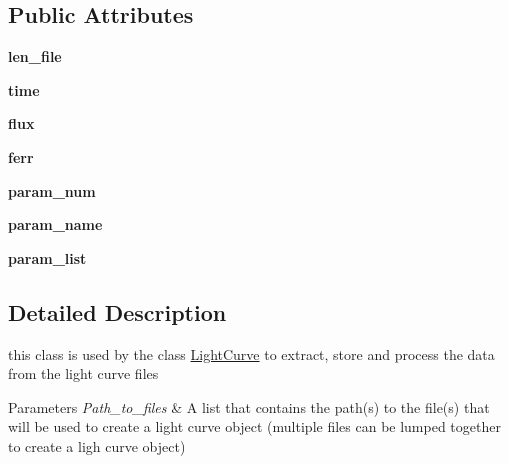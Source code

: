 \subsection*{Public Attributes}
\begin{DoxyCompactItemize}
\item 
\mbox{\label{classexospec_1_1lc__class_1_1_light_curve_data_adec28cf813c15d7c75f402d7bb51804d}} 
{\bfseries len\+\_\+file}
\item 
\mbox{\label{classexospec_1_1lc__class_1_1_light_curve_data_a118772717cee974c8f56534c1c4fa9bd}} 
{\bfseries time}
\item 
\mbox{\label{classexospec_1_1lc__class_1_1_light_curve_data_a8f871e916a7b560139181bf8cb9d0784}} 
{\bfseries flux}
\item 
\mbox{\label{classexospec_1_1lc__class_1_1_light_curve_data_adcc1b218150a87e12fd77a65103f4322}} 
{\bfseries ferr}
\item 
\mbox{\label{classexospec_1_1lc__class_1_1_light_curve_data_a0e0ef1bb47bea5bf61b47493a49eb2c1}} 
{\bfseries param\+\_\+num}
\item 
\mbox{\label{classexospec_1_1lc__class_1_1_light_curve_data_a2b6db36191285094a8456aba0f339b4a}} 
{\bfseries param\+\_\+name}
\item 
\mbox{\label{classexospec_1_1lc__class_1_1_light_curve_data_a0d1f6258313a1e9ceb9bbe8ddf59eb76}} 
{\bfseries param\+\_\+list}
\end{DoxyCompactItemize}


\subsection{Detailed Description}
this class is used by the class \hyperlink{classexospec_1_1lc__class_1_1_light_curve}{Light\+Curve} to extract, store and process the data from the light curve files 


\begin{DoxyParams}{Parameters}
{\em Path\+\_\+to\+\_\+files} & A list that contains the path(s) to the file(s) that will be used to create a light curve object (multiple files can be lumped together to create a ligh curve object) \\
\hline
\end{DoxyParams}


